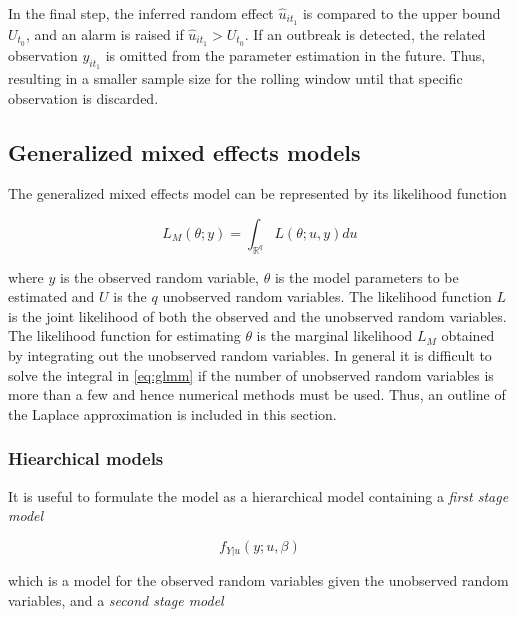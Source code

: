 \documentclass[preprint, 3p, authoryear]{elsarticle} %
\begin{document}
In the final step, the inferred random effect \(\hat{u}_{it_1}\) is compared to the upper bound \(U_{t_0}\), and an alarm is raised if \(\hat{u}_{it_1}>U_{t_0}\). If an outbreak is detected, the related observation \(y_{it_1}\) is omitted from the parameter estimation in the future. Thus, resulting in a smaller sample size for the rolling window until that specific observation is discarded.

\hypertarget{generalized-mixed-effects-models}{%
\subsection{\texorpdfstring{Generalized mixed effects models \label{glmm}}{Generalized mixed effects models }}\label{generalized-mixed-effects-models}}

The generalized mixed effects model can be represented by its likelihood function

\begin{equation}\label{eq:glmm}
  L_{M}(\theta; y)=\int_{\mathbb{R}^{q}} L(\theta;u,y) du
\end{equation}

where \(y\) is the observed random variable, \(\theta\) is the model parameters to be estimated and \(U\) is the \(q\) unobserved random variables. The likelihood function \(L\) is the joint likelihood of both the observed and the unobserved random variables. The likelihood function for estimating \(\theta\) is the marginal likelihood \(L_{M}\) obtained by integrating out the unobserved random variables. In general it is difficult to solve the integral in \eqref{eq:glmm} if the number of unobserved random variables is more than a few and hence numerical methods must be used. Thus, an outline of the Laplace approximation is included in this section.

\hypertarget{hiearchical-models}{%
\subsubsection{Hiearchical models}\label{hiearchical-models}}

It is useful to formulate the model as a hierarchical model containing a \emph{first stage model}

\begin{equation}\label{eq:firstStage}
  f_{Y|u}(y;u,\beta)
\end{equation}

which is a model for the observed random variables given the unobserved random variables, and a \emph{second stage model}
\end{document}
